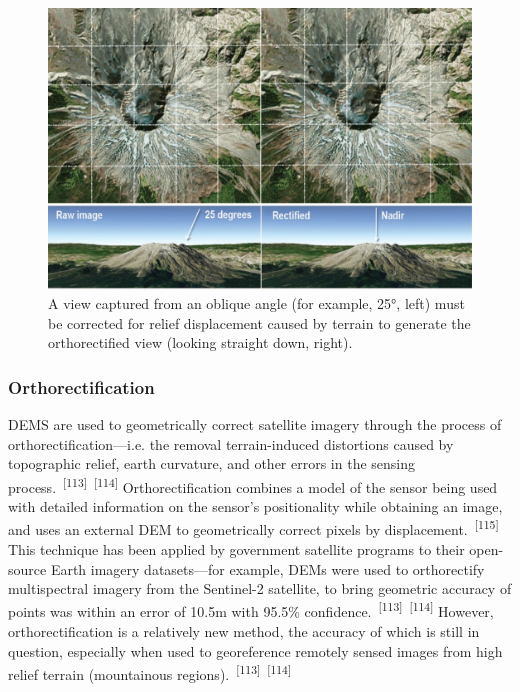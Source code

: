 \documentclass{article}
\begin{document}
\begin{figure}
    \centering
    \includegraphics[width=1.0\linewidth]{images/orthorectified.jpg}
    \caption{A view captured from an oblique angle (for example, 25°, left) must be corrected for relief displacement caused by terrain to generate the orthorectified view (looking straight down, right).}
    \label{figure31}
\end{figure}

\subsubsection{Orthorectification}

\par{DEMS are used to geometrically correct satellite imagery through the process of orthorectification---i.e. the removal terrain-induced distortions caused by topographic relief, earth curvature, and other errors in the sensing process.~\textsuperscript{[113]}~\textsuperscript{[114]} Orthorectification combines a model of the sensor being used with detailed information on the sensor's positionality while obtaining an image, and uses an external DEM to geometrically correct pixels by displacement.~\textsuperscript{[115]} This technique has been applied by government satellite programs to their open-source Earth imagery datasets---for example, DEMs were used to orthorectify multispectral imagery from the Sentinel-2 satellite, to bring geometric accuracy of points was within an error of 10.5m with 95.5\% confidence.~\textsuperscript{[113]}~\textsuperscript{[114]} However, orthorectification is a relatively new method, the accuracy of which is still in question, especially when used to georeference remotely sensed images from high relief terrain (mountainous regions).~\textsuperscript{[113]}~\textsuperscript{[114]}}
\end{document}
